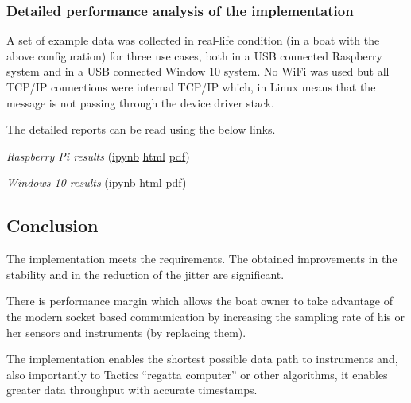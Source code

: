 \documentclass[11pt]{article}
\begin{document}
    \hypertarget{detailed-performance-analysis-of-the-implementation}{%
\subsubsection{Detailed performance analysis of the
implementation}\label{detailed-performance-analysis-of-the-implementation}}

    A set of example data was collected in real-life condition (in a boat
with the above configuration) for three use cases, both in a USB
connected Raspberry system and in a USB connected Window 10 system. No
WiFi was used but all TCP/IP connections were internal TCP/IP which, in
Linux means that the message is not passing through the device driver
stack.

    The detailed reports can be read using the below links.

    \emph{Raspberry Pi results}
(\href{analysis/Three-way_timestamps/Three-way_timestamps_Rpi.ipynb}{ipynb}
\textbar{}
\href{analysis/Three-way_timestamps/Three-way_timestamps_Rpi.html}{html}
\textbar{}
\href{analysis/Three-way_timestamps/Three-way_timestamps_Rpi.pdf}{pdf})

    \emph{Windows 10 results}
(\href{analysis/Three-way_timestamps/Three-way_timestamps_win10.ipynb}{ipynb}
\textbar{}
\href{analysis/Three-way_timestamps/Three-way_timestamps_win10.html}{html}
\textbar{}
\href{analysis/Three-way_timestamps/Three-way_timestamps_win10.pdf}{pdf})

    \hypertarget{conclusion}{%
\subsection{Conclusion}\label{conclusion}}

    The implementation meets the requirements. The obtained improvements in
the stability and in the reduction of the jitter are significant.

    There is performance margin which allows the boat owner to take
advantage of the modern socket based communication by increasing the
sampling rate of his or her sensors and instruments (by replacing them).

    The implementation enables the shortest possible data path to
instruments and, also importantly to Tactics ``regatta computer'' or
other algorithms, it enables greater data throughput with accurate
timestamps.


    
    
    
\end{document}

